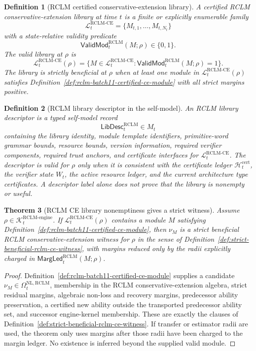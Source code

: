 \documentclass[11pt,a4paper]{article}
\newtheorem{theorem}{Theorem}[section]
\newtheorem{definition}[theorem]{Definition}
\newcommand{\Lcal}{\mathcal L}
\newcommand{\Kcal}{\mathcal K}
\newcommand{\RCLM}{\mathrm{RCLM}}
\newcommand{\cert}{\mathrm{cert}}
\newcommand{\engine}{\mathrm{engine}}
\newcommand{\NL}{\mathrm{NL}}
\newcommand{\CE}{\mathrm{CE}}
\begin{document}
\begin{definition}[RCLM certified conservative-extension library]
\label{def:rclm-batch11-ce-library}
A certified RCLM conservative-extension library at time \(t\) is a finite or explicitly enumerable family
\[
\Lcal_t^{\RCLM\text{-}\CE}=\{M_{t,1},\ldots,M_{t,N_t}\}
\]
with a state-relative validity predicate
\[
\mathsf{ValidMod}_t^{\RCLM}(M;\rho)\in\{0,1\}.
\]
The valid library at \(\rho\) is
\[
\Lcal_t^{\RCLM\text{-}\CE}(\rho)
=
\{M\in\Lcal_t^{\RCLM\text{-}\CE}:\mathsf{ValidMod}_t^{\RCLM}(M;\rho)=1\}.
\]
The library is strictly beneficial at \(\rho\) when at least one module in \(\Lcal_t^{\RCLM\text{-}\CE}(\rho)\) satisfies Definition~\ref{def:rclm-batch11-certified-ce-module} with all strict margins positive.
\end{definition}

\begin{definition}[RCLM library descriptor in the self-model]
\label{def:rclm-batch11-library-descriptor}
An RCLM library descriptor is a typed self-model record
\[
\mathsf{LibDesc}_t^{\RCLM}\in M_t
\]
containing the library identity, module template identifiers, primitive-word grammar bounds, resource bounds, version information, required verifier components, required trust anchors, and certificate interfaces for \(\Lcal_t^{\RCLM\text{-}\CE}\).  The descriptor is valid for \(\rho\) only when it is consistent with the certificate ledger \(\mathcal H_t^{\cert}\), the verifier state \(W_t\), the active resource ledger, and the current architecture type certificates.  A descriptor label alone does not prove that the library is nonempty or useful.
\end{definition}

\begin{theorem}[RCLM CE library nonemptiness gives a strict witness]
\label{thm:rclm-batch11-library-nonempty-strict-witness}
Assume \(\rho\in\Kcal_t^{\RCLM\text{-}\engine}\).  If \(\Lcal_t^{\RCLM\text{-}\CE}(\rho)\) contains a module \(M\) satisfying Definition~\ref{def:rclm-batch11-certified-ce-module}, then \(\nu_M\) is a strict beneficial RCLM conservative-extension witness for \(\rho\) in the sense of Definition~\ref{def:strict-beneficial-rclm-ce-witness}, with margins reduced only by the radii explicitly charged in \(\mathsf{MargLed}_t^{\RCLM}(M;\rho)\).
\end{theorem}

\begin{proof}
Definition~\ref{def:rclm-batch11-certified-ce-module} supplies a candidate \(\nu_M\in\Omega_t^{\NL,\RCLM}\), membership in the RCLM conservative-extension algebra, strict residual margins, algebraic non-loss and recovery margins, predecessor ability preservation, a certified new ability outside the transported predecessor ability set, and successor engine-kernel membership.  These are exactly the clauses of Definition~\ref{def:strict-beneficial-rclm-ce-witness}.  If transfer or estimator radii are used, the theorem only uses margins after those radii have been charged to the margin ledger.  No existence is inferred beyond the supplied valid module.
\end{proof}
\end{document}
